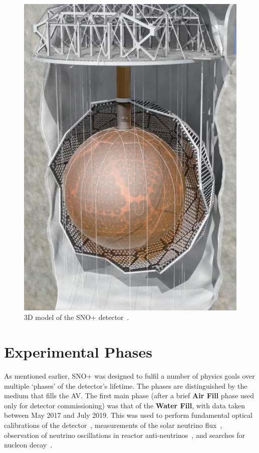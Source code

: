 \begin{figure}
    \centering
    \includegraphics[width=0.48\linewidth]{2_Detector/Figs/detector_picture.png}
    \caption[3D model of the SNO+ detector]{3D model of the SNO+ detector~\cite{albaneseSNOExperiment2021}.}
    \label{fig:snoplus_detector}
\end{figure}

\section{Experimental Phases}\label{sec:exp_phases}
As mentioned earlier, SNO+ was designed to fulfil a number of physics goals over multiple `phases' of the detector's lifetime. The phases are distinguished by the medium that fills the AV. The first main phase (after a brief \textbf{Air Fill} phase used only for detector commissioning) was that of the \textbf{Water Fill}, with data taken between May 2017 and July 2019. This was used to perform fundamental optical calibrations of the detector~\cite{andersonOpticalCalibrationSNO2021}, %
measurements of the solar neutrino flux~\cite{andersonMeasurementSolarNeutrino2019}, %
observation of neutrino oscillations in reactor anti-neutrinos~\cite{allegaEvidenceAntineutrinosDistant2023}, %
and searches for nucleon decay~\cite{andersonSearchInvisibleModes2019,allegaImprovedSearchInvisible2022}. %

